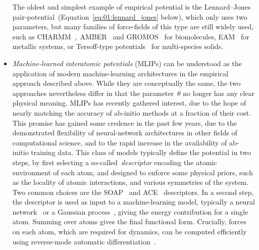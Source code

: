 \begin{itemize}
{    The oldest and simplest example of empirical potential is the Lennard--Jones pair-potential~(Equation~\eqref{eq:01:lennard_jones} below), which only uses two parameters, but many families of force-fields of this type are still widely used, such as CHARMM~\cite{BBOSSK83},~AMBER~\cite{PCCRCDFSK95} and GROMOS~\cite{SHTMBFTHKVG99} for biomolecules, EAM~\cite{DB84} for metallic systems, or Tersoff-type potentials~\cite{T89} for multi-species solids.}
    \item{\textit{Machine-learned interatomic potentials} (MLIPs) can be understood as the application of modern machine-learning architectures in the empirical approach described above. While they are conceptually the same, the two approaches nevertheless differ in that the parameter~$\theta$ no longer has any clear physical meaning. MLIPs has recently gathered interest, due to the hope of nearly matching the accuracy of ab-initio methods at a fraction of their cost. This promise has gained some credence in the past few years, due to the demonstrated flexibility of neural-network architectures in other fields of computational science, and to the rapid increase in the availability of ab-initio training data. This class of models typically define the potential in two steps, by first selecting a so-called~\textit{descriptor} encoding the atomic environment of each atom, and designed to enforce some physical priors, such as the locality of atomic interactions, and various symmetries of the system. Two common choices are the SOAP~\cite{BKC13} and ACE~\cite{D19} descriptors.
    In a second step, the descriptor is used as input to a machine-learning model, typically a neural network~\cite{BP07} or a Gaussian process~\cite{BPKC10}, giving the energy contribution for a single atom. Summing over atoms gives the final functional form. Crucially, forces on each atom, which are required for dynamics, can be computed efficiently using reverse-mode automatic differentiation~\cite{BPRS18}.
    }
\end{itemize}

